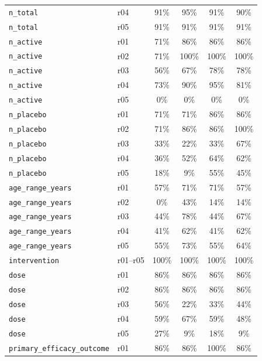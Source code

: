 \documentclass[a4paper,fleqn]{cas-sc}
\begin{document}
\begin{table}[ht]
\begin{tabular*}{\tblwidth}{@{}p{3.6cm}p{0.6cm}cccc@{}}
\texttt{n\_total}           & r04 & 91\%  & 95\%  & 91\%  & 90\%  \\
\texttt{n\_total}           & r05 & 91\%  & 91\%  & 91\%  & 91\%  \\
\midrule
\texttt{n\_active}          & r01 & 71\%  & 86\%  & 86\%  & 86\%  \\
\texttt{n\_active}          & r02 & 71\%  & 100\% & 100\% & 100\% \\
\texttt{n\_active}          & r03 & 56\%  & 67\%  & 78\%  & 78\%  \\
\texttt{n\_active}          & r04 & 73\%  & 90\%  & 95\%  & 81\%  \\
\texttt{n\_active}          & r05 & 0\%   & 0\%   & 0\%   & 0\%   \\
\midrule
\texttt{n\_placebo}         & r01 & 71\%  & 71\%  & 86\%  & 86\%  \\
\texttt{n\_placebo}         & r02 & 71\%  & 86\%  & 86\%  & 100\% \\
\texttt{n\_placebo}         & r03 & 33\%  & 22\%  & 33\%  & 67\%  \\
\texttt{n\_placebo}         & r04 & 36\%  & 52\%  & 64\%  & 62\%  \\
\texttt{n\_placebo}         & r05 & 18\%  & 9\%   & 55\%  & 45\%  \\
\midrule
\texttt{age\_range\_years}  & r01 & 57\%  & 71\%  & 71\%  & 57\%  \\
\texttt{age\_range\_years}  & r02 & 0\%   & 43\%  & 14\%  & 14\%  \\
\texttt{age\_range\_years}  & r03 & 44\%  & 78\%  & 44\%  & 67\%  \\
\texttt{age\_range\_years}  & r04 & 41\%  & 62\%  & 41\%  & 62\%  \\
\texttt{age\_range\_years}  & r05 & 55\%  & 73\%  & 55\%  & 64\%  \\
\midrule
\texttt{intervention}       & r01--r05 & 100\% & 100\% & 100\% & 100\% \\
\midrule
\texttt{dose}               & r01 & 86\%  & 86\%  & 86\%  & 86\%  \\
\texttt{dose}               & r02 & 86\%  & 86\%  & 86\%  & 86\%  \\
\texttt{dose}               & r03 & 56\%  & 22\%  & 33\%  & 44\%  \\
\texttt{dose}               & r04 & 59\%  & 67\%  & 59\%  & 48\%  \\
\texttt{dose}               & r05 & 27\%  & 9\%   & 18\%  & 9\%   \\
\midrule
\texttt{primary\_efficacy\_outcome} & r01 & 86\% & 86\% & 100\% & 86\% \\

\end{tabular*}
\end{table}
\end{document}
